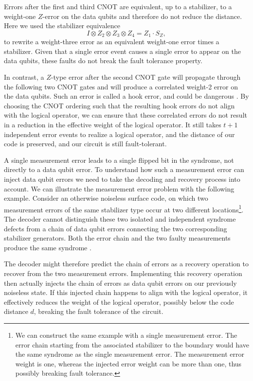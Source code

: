 \begin{enumerate}
Errors after the first and third CNOT are equivalent, up to a stabilizer, to a weight-one $Z$-error on the data qubits and therefore do not reduce the distance.
Here we used the stabilizer equivalence 
\begin{equation}
    I \otimes Z_2 \otimes Z_3 \otimes Z_4 = Z_1 \cdot S_Z,
\end{equation} 
to rewrite a weight-three error as an equivalent weight-one error times a stabilizer. 
Given that a single error event causes a single error to appear on the data qubits, these faults do not break the fault tolerance property.

In contrast, a $Z$-type error after the second CNOT gate will propagate through the following two CNOT gates 
and will produce a correlated weight-2 error on the data qubits.
Such an error is called a hook error, and could be dangerous \cite{topological_quantum_memory}.
By choosing the CNOT ordering such that the resulting hook errors do not align with the logical operator,
 we can ensure that these correlated errors do not result in a reduction in the effective weight of the logical operator.
It still takes $t + 1$ independent error events to realize a logical operator, and the distance of our code is preserved, 
and our circuit is still fault-tolerant.
\end{enumerate}

A single measurement error leads to a single flipped bit in the syndrome, not directly to a data qubit error. 
To understand how such a measurement error can inject data qubit errors we need to take the decoding and recovery process into account. 
We can illustrate the measurement error problem with the following example.
Consider an otherwise noiseless surface code, on which two measurement errors of the same stabilizer type occur at two different locations\footnote{
    We can construct the same example with a single measurement error. 
    The error chain starting from the associated stabilizer to the boundary would have the same syndrome as the single measurement error.
    The measurement error weight is one, whereas the injected error weight can be more than one,
    thus possibly breaking fault tolerance.
}.
The decoder cannot distinguish these two isolated and independent syndrome defects from a chain of data qubit errors connecting the two corresponding stabilizer generators.
Both the error chain and the two faulty measurements produce the same syndrome \cite{gottesmann_book,topological_quantum_memory}.

The decoder might therefore predict the chain of errors as a recovery operation to recover from the two measurement errors.
Implementing this recovery operation then actually injects the chain of errors as data qubit errors on our previously noiseless state.
If this injected chain happens to align with the logical operator, 
it effectively reduces the weight of the logical operator, 
possibly below the code distance $d$, breaking the fault tolerance of the circuit.

